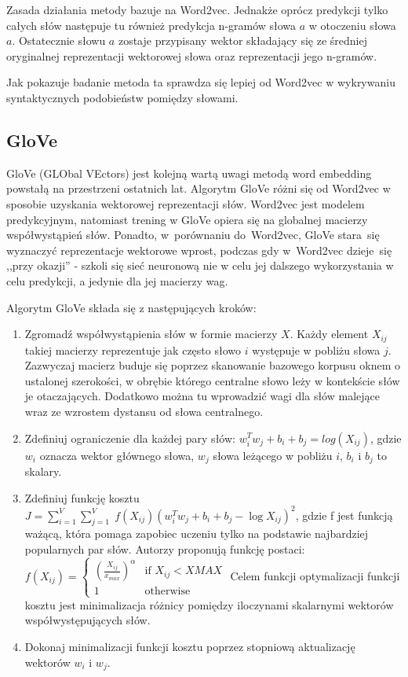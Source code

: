 \documentclass[pl]{minipw} %
\begin{document}
Zasada działania metody bazuje na Word2vec. Jednakże oprócz predykcji tylko całych słów następuje tu również predykcja n-gramów słowa $a$ w otoczeniu słowa $a$. Ostatecznie słowu $a$ zostaje przypisany wektor składający się ze średniej oryginalnej reprezentacji wektorowej słowa oraz reprezentacji jego n-gramów.

Jak pokazuje badanie\cite{fast_text_word2vec} metoda ta sprawdza się lepiej od Word2vec w wykrywaniu syntaktycznych podobieństw pomiędzy słowami. 

\subsection{GloVe}

GloVe\cite{glove} (GLObal VEctors) jest kolejną wartą uwagi metodą word embedding powstałą na przestrzeni ostatnich lat. Algorytm GloVe różni się od Word2vec w sposobie uzyskania wektorowej reprezentacji słów. Word2vec jest modelem predykcyjnym, natomiast trening w GloVe opiera się na globalnej macierzy współwystąpień słów. Ponadto, w~porównaniu do~Word2vec, GloVe stara~się wyznaczyć reprezentacje wektorowe wprost, podczas gdy w~Word2vec dzieje~się ,,przy okazji'' - szkoli się sieć neuronową nie w celu jej dalszego wykorzystania w celu predykcji, a jedynie dla jej macierzy wag. 

Algorytm GloVe składa się z następujących kroków\cite{glove_cran}:
\begin{enumerate}
	\item Zgromadź współwystąpienia słów w formie macierzy $X$. Każdy element $X_{ij}$ takiej macierzy reprezentuje jak często słowo $i$ występuje w pobliżu słowa $j$. Zazwyczaj macierz buduje się poprzez skanowanie bazowego korpusu oknem o ustalonej szerokości, w obrębie którego centralne słowo leży w kontekście słów je otaczających. Dodatkowo można tu wprowadzić wagi dla słów malejące wraz ze wzrostem dystansu od słowa centralnego.
	\item Zdefiniuj ograniczenie dla każdej pary słów: $w_i^Tw_j + b_i + b_j = log(X_{ij})$, gdzie $w_i$ oznacza wektor głównego słowa, $w_j$ słowa leżącego w pobliżu $i$, $b_i$ i $b_j$ to skalary.
	\item Zdefiniuj funkcję kosztu $J = \sum_{i=1}^V \sum_{j=1}^V \; f(X_{ij}) ( w_i^T w_j + b_i + b_j - \log X_{ij})^2$, gdzie f jest funkcją ważącą, która pomaga zapobiec uczeniu tylko na podstawie najbardziej popularnych par słów. Autorzy proponują funkcję postaci:
	$f(X_{ij}) = 
	\begin{cases}
	(\frac{X_{ij}}{x_{max}})^\alpha & \text{if } X_{ij} < XMAX \\
	1 & \text{otherwise}
	\end{cases}$
	Celem funkcji optymalizacji funkcji	 kosztu jest minimalizacja różnicy pomiędzy iloczynami skalarnymi wektorów współwystępujących słów.
	\item Dokonaj minimalizacji funkcji kosztu poprzez stopniową aktualizację wektorów $w_i$ i $w_j$.
\end{enumerate}
\end{document}
